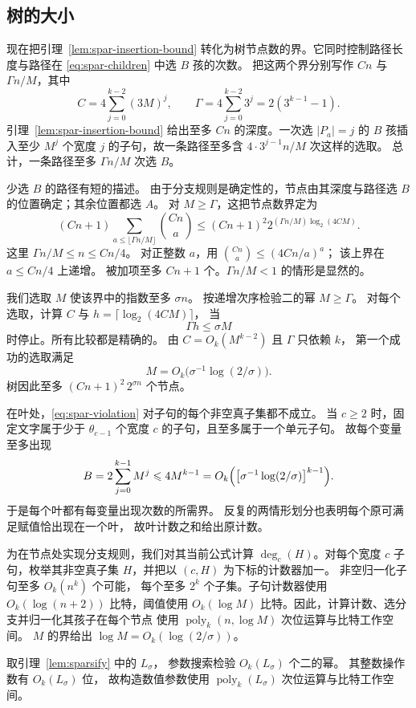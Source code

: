 \documentclass[11pt,reqno]{amsart}
\numberwithin{equation}{section}
\theoremstyle{definition}\newtheorem{definition}[theorem]{定义}
\theoremstyle{remark}\newtheorem{remark}[theorem]{注}
\newcommand{\poly}{\operatorname{poly}}
\renewcommand{\le}{\leqslant}
\renewcommand{\ge}{\geqslant}
\begin{document}
\subsection{树的大小}
现在把引理~\ref{lem:spar-insertion-bound}
转化为树节点数的界。它同时控制路径长度与路径在
\eqref{eq:spar-children} 中选 $B$ 孩的次数。
把这两个界分别写作 $Cn$ 与 $\Gamma n/M$，其中
\[
 C=4\sum_{j=0}^{k-2}(3M)^j,\qquad
 \Gamma=4\sum_{j=0}^{k-2}3^j=2(3^{k-1}-1).
\]
引理~\ref{lem:spar-insertion-bound} 给出至多 $Cn$
的深度。一次选 $|P_a|=j$ 的 $B$ 孩插入至少 $M^j$
个宽度 $j$ 的子句，故一条路径至多含
$4\cdot3^{j-1}n/M$ 次这样的选取。
总计，一条路径至多 $\Gamma n/M$ 次选 $B$。

少选 $B$ 的路径有短的描述。
由于分支规则是确定性的，节点由其深度与路径选 $B$
的位置确定；其余位置都选 $A$。
对 $M\ge\Gamma$，这把节点数界定为
\[
 (Cn+1)\sum_{a\le\lfloor\Gamma n/M\rfloor}\binom{Cn}{a}
 \le (Cn+1)^2
       2^{(\Gamma n/M)\log_2(4CM)}.
\]
这里 $\Gamma n/M\le n\le Cn/4$。
对正整数 $a$，用 $\binom{Cn}{a}\le(4Cn/a)^a$；
该上界在 $a\le Cn/4$ 上递增。
被加项至多 $Cn+1$ 个。$\Gamma n/M<1$
的情形是显然的。

我们选取 $M$ 使该界中的指数至多 $\sigma n$。
按递增次序检验二的幂 $M\ge\Gamma$。
对每个选取，计算 $C$ 与 $h=\lceil\log_2(4CM)\rceil$，
当
\[
 \Gamma h\le\sigma M
\]
时停止。所有比较都是精确的。
由 $C=O_k(M^{k-2})$ 且 $\Gamma$ 只依赖 $k$，
第一个成功的选取满足
\[
 M=O_k\bigl(\sigma^{-1}\log(2/\sigma)\bigr).
\]
树因此至多 $(Cn+1)^2\,2^{\sigma n}$ 个节点。

在叶处，\eqref{eq:spar-violation}
对子句的每个非空真子集都不成立。
当 $c\ge2$ 时，固定文字属于少于 $\theta_{c-1}$
个宽度 $c$ 的子句，且至多属于一个单元子句。
故每个变量至多出现
\[
 B=2\sum_{j=0}^{k-1}M^j
   \le4M^{k-1}
   =O_k\Bigl(\bigl[\sigma^{-1}\log(2/\sigma)\bigr]^{k-1}\Bigr).
\]
于是每个叶都有每变量出现次数的所需界。
反复的两情形划分也表明每个原可满足赋值恰出现在一个叶，
故叶计数之和给出原计数。

为在节点处实现分支规则，我们对其当前公式计算
$\deg_c(H)$。对每个宽度 $c$ 子句，枚举其非空真子集
$H$，并把以 $(c,H)$ 为下标的计数器加一。
非空归一化子句至多 $O_k(n^k)$ 个可能，
每个至多 $2^k$ 个子集。子句计数器使用
$O_k(\log(n+2))$ 比特，阈值使用 $O_k(\log M)$
比特。因此，计算计数、选分支并归一化其孩子在每个节点
使用 $\poly_k(n,\log M)$ 次位运算与比特工作空间。
$M$ 的界给出 $\log M=O_k(\log(2/\sigma))$。

取引理~\ref{lem:sparsify} 中的 $L_\sigma$，
参数搜索检验 $O_k(L_\sigma)$ 个二的幂。
其整数操作数有 $O_k(L_\sigma)$ 位，
故构造数值参数使用 $\poly_k(L_\sigma)$
次位运算与比特工作空间。
\end{document}
